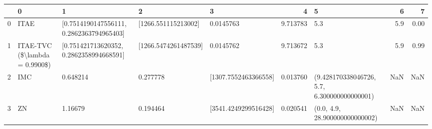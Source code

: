 \begin{tabular}{lllllrlrr}
\toprule
{} &                              0 &                                         1 &                     2 &                     3 &         4 &                                            5 &    6 &     7 \\
\midrule
0 &                           ITAE &  [0.7514190147556111, 0.2862363794965403] &   [1266.551115213002] &             0.0145763 &  9.713783 &                                          5.3 &  5.9 &  0.00 \\
1 &  ITAE-TVC (\$\textbackslash lambda = 0.9900\$) &   [0.751421713620352, 0.2862358994668591] &  [1266.5474261487539] &             0.0145762 &  9.713672 &                                          5.3 &  5.9 &  0.99 \\
2 &                            IMC &                                  0.648214 &              0.277778 &  [1307.7552463366558] &  0.013760 &  (9.428170338046726, 5.7, 6.300000000000001) &  NaN &   NaN \\
3 &                             ZN &                                   1.16679 &              0.194464 &  [3541.4249299516428] &  0.020541 &               (0.0, 4.9, 28.900000000000002) &  NaN &   NaN \\
\bottomrule
\end{tabular}
